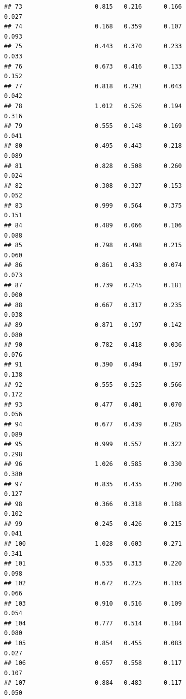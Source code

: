 \documentclass[]{article}
\begin{document}
\begin{verbatim}
## 73                    0.815   0.216      0.166                     0.027
## 74                    0.168   0.359      0.107                     0.093
## 75                    0.443   0.370      0.233                     0.033
## 76                    0.673   0.416      0.133                     0.152
## 77                    0.818   0.291      0.043                     0.042
## 78                    1.012   0.526      0.194                     0.316
## 79                    0.555   0.148      0.169                     0.041
## 80                    0.495   0.443      0.218                     0.089
## 81                    0.828   0.508      0.260                     0.024
## 82                    0.308   0.327      0.153                     0.052
## 83                    0.999   0.564      0.375                     0.151
## 84                    0.489   0.066      0.106                     0.088
## 85                    0.798   0.498      0.215                     0.060
## 86                    0.861   0.433      0.074                     0.073
## 87                    0.739   0.245      0.181                     0.000
## 88                    0.667   0.317      0.235                     0.038
## 89                    0.871   0.197      0.142                     0.080
## 90                    0.782   0.418      0.036                     0.076
## 91                    0.390   0.494      0.197                     0.138
## 92                    0.555   0.525      0.566                     0.172
## 93                    0.477   0.401      0.070                     0.056
## 94                    0.677   0.439      0.285                     0.089
## 95                    0.999   0.557      0.322                     0.298
## 96                    1.026   0.585      0.330                     0.380
## 97                    0.835   0.435      0.200                     0.127
## 98                    0.366   0.318      0.188                     0.102
## 99                    0.245   0.426      0.215                     0.041
## 100                   1.028   0.603      0.271                     0.341
## 101                   0.535   0.313      0.220                     0.098
## 102                   0.672   0.225      0.103                     0.066
## 103                   0.910   0.516      0.109                     0.054
## 104                   0.777   0.514      0.184                     0.080
## 105                   0.854   0.455      0.083                     0.027
## 106                   0.657   0.558      0.117                     0.107
## 107                   0.884   0.483      0.117                     0.050

\end{verbatim}
\end{document}
